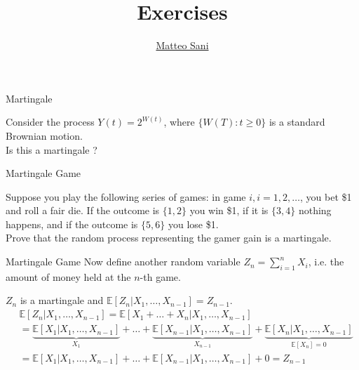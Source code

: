 \documentclass{beamer}
\title{Exercises}
\author{\href{mailto:matteo.sani@unisi.it}{Matteo Sani}}
\begin{document}
\begin{frame}[plain]
  \maketitle
\end{frame}

\begin{frame}{Martingale}
\begin{block}{}
Consider the process $Y(t) = 2^{W(t)}$, where $\{W(T):t\geq 0\}$ is a standard Brownian motion. \\
Is this a martingale ?
\end{block}
\end{frame}

\begin{frame}{Martingale Game}
\begin{block}{}
Suppose you play the following series of games: in game $i, i = 1, 2,\ldots$, you bet \$1 and roll a fair die. If the outcome is $\{1,2\}$ you win \$1, if it is $\{3,4\}$ nothing happens, and if the outcome is $\{5,6\}$ you lose \$1.\\
Prove that the random process representing the gamer gain is a martingale.
\end{block}
\end{frame}

\begin{frame}{Martingale Game}
Now define another random variable $Z_n = \sum_{i=1}^{n} X_i$, i.e. the amount of money held at the $n$-th game.

$Z_n$ is a martingale and $\mathbb{E}[Z_n|X_1,\ldots, X_{n-1}] = Z_{n-1}$.
\begin{equation*}
	\begin{aligned}
		&\mathbb{E}[Z_n|X_1,\ldots, X_{n-1}] = \mathbb{E}[X_1 +\ldots + X_n|X_1,\ldots, X_{n-1}] \\
		& = \underbrace{\mathbb{E}[X_1|X_1,\ldots, X_{n-1}]}_{X_1} + \ldots + \underbrace{\mathbb{E}[X_{n-1}|X_1,\ldots, X_{n-1}]}_{X_{n-1}} + \underbrace{\mathbb{E}[X_n|X_1,\ldots, X_{n-1}]}_{\mathbb{E}[X_n]=0} \\
		& = \mathbb{E}[X_1|X_1,\ldots, X_{n-1}] + \ldots + \mathbb{E}[X_{n-1}|X_1,\ldots, X_{n-1}] + 0 = Z_{n-1}
	\end{aligned}
\end{equation*}
\end{frame}
\end{document}
